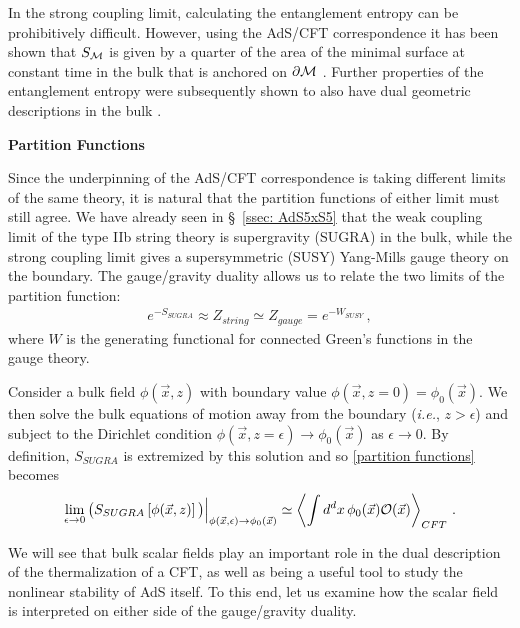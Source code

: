 \documentclass[../PhD.tex]{subfiles}
\begin{document}
In the strong coupling limit, calculating the entanglement entropy can be prohibitively difficult. However, using the AdS/CFT correspondence it has been shown that $S_{\mathcal M}$ is given by a quarter of the area of the minimal surface at constant time in the bulk that is anchored on $\partial \mathcal M$ \cite{hep-th/0603001}. Further properties of the entanglement entropy were subsequently shown to also have dual geometric descriptions in the bulk \cite{1304.4926}.

{\bf Partition Functions}

Since the underpinning of the AdS/CFT correspondence is taking different limits of the same theory, it is natural that the partition functions of either limit must still agree. We have already seen in \S~\!\ref{ssec: AdS5xS5} that the weak coupling limit of the type IIb string theory is supergravity (SUGRA) in the bulk, while the strong coupling limit gives a supersymmetric (SUSY) Yang-Mills gauge theory on the boundary. The gauge/gravity duality allows us to relate the two limits of the partition function:
\begin{align}
\label{partition functions}
e^{-S_{SUGRA}} \approx Z_{string} \simeq Z_{gauge} = e^{-W_{SUSY}} \, ,
\end{align}
where $W$ is the generating functional for connected Green's functions in the gauge theory.

Consider a bulk field $\phi(\vec x,z)$ with boundary value $\phi(\vec x, z=0) = \phi_0 (\vec x)$. We then solve the bulk equations of motion away from the boundary ({\it i.e.}, $z > \epsilon$) and subject to the Dirichlet condition $\phi(\vec x, z=\epsilon) \to \phi_0(\vec x)$ as $\epsilon \to 0$. By definition, $S_{SUGRA}$ is extremized by this solution and so \eqref{partition functions} becomes \cite{hep-th/9802109, hep-th/9802150}
\begin{align}
\label{ads/cft duality}
\lim_{\epsilon \to 0} \big( S_{SUGRA} \left[ \phi(\vec x, z) \right] \big) \Big|_{\phi (\vec x, \epsilon) \to \phi_0(\vec x)} \simeq \left\langle \int d^dx \, \phi_0(\vec x) \mathcal O(\vec x) \right\rangle_{CFT} \, .
\end{align}

We will see that bulk scalar fields play an important role in the dual description of the thermalization of a CFT, as well as being a useful tool to study the nonlinear stability of AdS itself. To this end, let us examine how the scalar field is interpreted on either side of the gauge/gravity duality.

\end{document}
